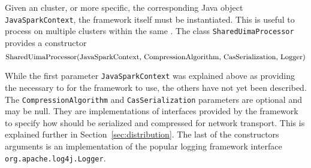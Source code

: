 Given an \spark{} cluster, or more specific, the corresponding Java object \lstinline|JavaSparkContext|, the framework itself must be instantiated. This is useful to process on multiple \spark{} clusters within the same \jvm{}. The class \lstinline|SharedUimaProcessor| provides a constructor 
\[ 
\text{\lstinline|SharedUimaProcessor(JavaSparkContext, CompressionAlgorithm, CasSerialization, Logger)|}
\]

While the first parameter \lstinline|JavaSparkContext| was explained above as providing the necessary \api{} to \spark{} for the framework to use, the others have not yet been described. The \lstinline|CompressionAlgorithm| and \lstinline|CasSerialization| parameters are optional and may be null. They are implementations of interfaces provided by the framework to specify how \cas{} should be serialized and compressed for network transport. This is explained further in Section~\ref{sec:distribution}. The last of the constructors arguments is an implementation of the popular logging framework interface \lstinline|org.apache.log4j.Logger|.

